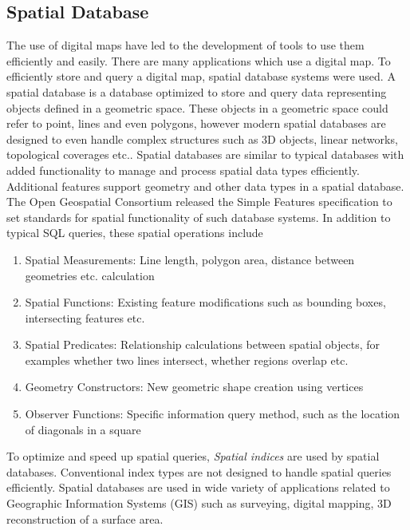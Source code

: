 \subsection{Spatial Database}
The use of digital maps have led to the development of tools to use them efficiently and easily. There are many applications which use a digital map. To efficiently store and query a digital map, spatial database systems were used. A spatial database \cite{bedard2007multiple} is a database optimized to store and query data representing objects defined in a geometric space. These objects in a geometric space could refer to point, lines and even polygons, however modern spatial databases are designed to even handle complex structures such as 3D objects, linear networks, topological coverages etc.. Spatial databases are similar to typical databases with added functionality to manage and process spatial data types efficiently. Additional features support geometry and other data types in a spatial database. The Open Geospatial Consortium \cite{lupp2008open} released the Simple Features specification \cite{isosfa} to set standards for spatial functionality of such database systems. In addition to typical SQL queries, these spatial operations include \begin{enumerate}
\item Spatial Measurements: Line length, polygon area, distance between geometries etc. calculation
\item Spatial Functions: Existing feature modifications such as bounding boxes, intersecting features etc.
\item Spatial Predicates: Relationship calculations between spatial objects, for examples whether two lines intersect, whether regions overlap etc.
\item Geometry Constructors: New geometric shape creation using vertices
\item Observer Functions: Specific information query method, such as the location of diagonals in a square
\end{enumerate}
To optimize and speed up spatial queries, \textit{Spatial indices} are used by spatial databases. Conventional index types are not designed to handle spatial queries efficiently. %
Spatial databases are used in wide variety of applications related to Geographic Information Systems (GIS) such as surveying, digital mapping, 3D reconstruction of a surface area. 
